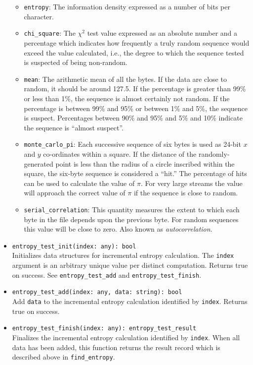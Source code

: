 \documentclass[10pt,landscape]{article}
\newcommand{\ReturnsTrueOnSuccess}{Returns true on success.\xspace}
\begin{document}
\begin{multicols*}{2}
\begin{itemize}
    \begin{itemize}
      \item \verb|entropy|: The information density expressed as a number of
        bits per character.
      \item \verb|chi_square|: The $\chi^2$ test value expressed as an absolute
        number and a percentage which indicates how frequently a truly random
        sequence would exceed the value calculated, i.e., the degree to which
        the sequence tested is suspected of being non-random.
      \item \verb|mean|: The arithmetic mean of all the bytes. If the data are
        close to random, it should be around 127.5.
        If the percentage is greater than 99\% or less than 1\%, the sequence
        is almost certainly not random. If the percentage is between 99\% and
        95\% or between 1\% and 5\%, the sequence is suspect. Percentages
        between 90\% and 95\% and 5\% and 10\% indicate the sequence is
        ``almost suspect''.
      \item \verb|monte_carlo_pi|: Each successive sequence of six bytes is
        used as 24-bit $x$ and $y$ co-ordinates within a square. If the
        distance of the randomly-generated point is less than the radius of a
        circle inscribed within the square, the six-byte sequence is considered
        a ``hit.'' The percentage of hits can be used to calculate the value of
        $\pi$. For very large streams the value will approach the correct value
        of $\pi$ if the sequence is close to random. 
      \item \verb|serial_correlation|: This quantity measures the extent to
        which each byte in the file depends upon the previous byte. For random
        sequences this value will be close to zero. Also known as
        \emph{autocorrelation}.
    \end{itemize}
  \item \verb|entropy_test_init(index: any): bool|\\
    Initializes data structures for incremental entropy calculation. The
    \verb|index| argument is an arbitrary unique value per distinct
    computation.
    \ReturnsTrueOnSuccess
    See \verb|entropy_test_add| and \verb|entropy_test_finish|.
  \item \verb|entropy_test_add(index: any, data: string): bool|\\
    Add \verb|data| to the incremental entropy calculation identified by
    \verb|index|.
    \ReturnsTrueOnSuccess
  \item \verb|entropy_test_finish(index: any): entropy_test_result|\\
    Finalizes the incremental entropy calculation identified by \verb|index|.
    When all data has been added, this function returns the result record which
    is described above in \verb|find_entropy|.
\end{itemize}


\end{multicols*}
\end{document}
